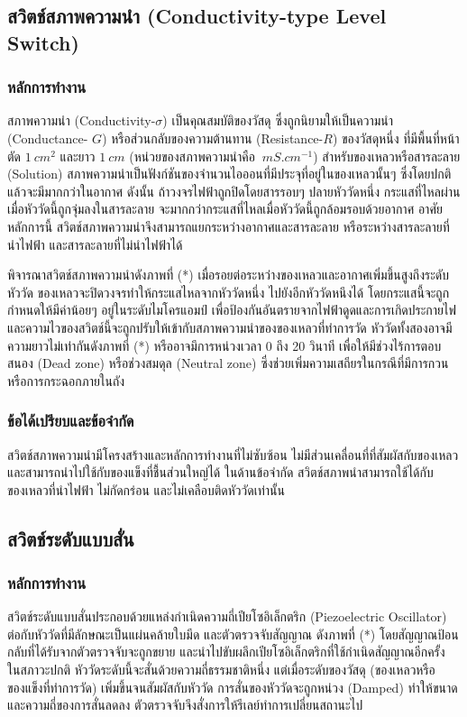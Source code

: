 \documentclass[final,11pt]{article}
\begin{document}
\subsection{สวิตช์สภาพความนำ (Conductivity-type Level Switch)}
\subsubsection{หลักการทำงาน}
สภาพความนำ (Conductivity-$\sigma$) เป็นคุณสมบัติของวัสดุ ซึ่งถูกนิยามให้เป็นความนำ (Conductance- $G$) 
หรือส่วนกลับของความต้านทาน (Resistance-$R$) ของวัสดุหนึ่ง ที่มีพื้นที่หน้าตัด $\SI{1}{cm^2}$ และยาว $\SI{1}{cm}$ 
(หน่วยของสภาพความนำคือ $\SI{}{mS.cm^{-1}}$) สำหรับของเหลวหรือสารละลาย (Solution) 
สภาพความนำเป็นฟังก์ชันของจำนวนไอออนที่มีประจุที่อยู่ในของเหลวนั้นๆ ซึ่งโดยปกติแล้วจะมีมากกว่าในอากาศ ดังนั้น 
ถ้าวงจรไฟฟ้าถูกปิดโดยสารรอบๆ ปลายหัววัดหนึ่ง กระแสที่ไหลผ่านเมื่อหัววัดนี้ถูกจุ่มลงในสารละลาย จะมากกว่ากระแสที่ไหลเมื่อหัววัดนี้ถูกล้อมรอบด้วยอากาศ
อาศัยหลักการนี้ สวิตช์สภาพความนำจึงสามารถแยกระหว่างอากาศและสารละลาย หรือระหว่างสารละลายที่นำไฟฟ้า และสารละลายที่ไม่นำไฟฟ้าได้ 

พิจารณาสวิตช์สภาพความนำดังภาพที่ (*) เมื่อรอยต่อระหว่างของเหลวและอากาศเพิ่มขึ้นสูงถึงระดับหัววัด ของเหลวจะปิดวงจรทำให้กระแสไหลจากหัววัดหนึ่ง
ไปยังอีกหัววัดหนึงได้ โดยกระแสนี้จะถูกกำหนดให้มีค่าน้อยๆ อยู่ในระดับไมโครแอมป์ เพื่อป้องกันอันตรายจากไฟฟ้าดูดและการเกิดประกายไฟ 
และความไวของสวิตช์นี้จะถูกปรับให้เข้ากับสภาพความนำของของเหลวที่ทำการวัด หัววัดทั้งสองอาจมีความยาวไม่เท่ากันดังภาพที่ (*) หรืออาจมึการหน่วงเวลา 0 ถึง 20 วินาที 
เพื่อให้มีช่วงไร้การตอบสนอง (Dead zone) หรือช่วงสมดุล (Neutral zone) ซึ่งช่วยเพิ่มความเสถียรในกรณีที่มีการกวน หรือการกระฉอกภายในถัง 

\subsubsection{ข้อได้เปรียบและข้อจำกัด}
สวิตช์สภาพความนำมีโครงสร้างและหลักการทำงานที่ไม่ซับซ้อน ไม่มีส่วนเคลื่อนที่ที่สัมผัสกับของเหลว และสามารถนำไปใช้กับของแข็งที่ชื้นส่วนใหญ่ได้ 
ในด้านข้อจำกัด สวิตช์สภาพนำสามารถใช้ได้กับของเหลวที่นำไฟฟ้า ไม่กัดกร่อน และไม่เคลือบติดหัววัดเท่านั้น

\subsection{สวิตช์ระดับแบบสั่น}
\subsubsection{หลักการทำงาน}
สวิตช์ระดับแบบสั่นประกอบด้วยแหล่งกำเนิดความถี่เปียโซอิเล็กตริก (Piezoelectric Oscillator) ต่อกับหัววัดที่มีลักษณะเป็นแผ่นคล้ายใบมีด 
และตัวตรวจจับสัญญาณ ดังภาพที่ (*) โดยสัญญาณป้อนกลับที่ได้รับจากตัวตรวจจับจะถูกขยาย และนำไปขับผลึกเปียโซอิเล็กตริกที่ใช้กำเนิดสัญญาณอีกครั้ง
ในสภาวะปกติ หัววัดระดับนี้จะสั่นด้วยความถี่ธรรมชาติหนึ่ง แต่เมื่อระดับของวัสดุ (ของเหลวหรือของแข็งที่ทำการวัด) เพิ่มขึ้นจนสัมผัสกับหัววัด 
การสั่นของหัววัดจะถูกหน่วง (Damped) ทำให้ขนาดและความถี่ของการสั่นลดลง ตัวตรวจจับจึงสั่งการให้รีเลย์ทำการเปลี่ยนสถานะไป
\end{document}
